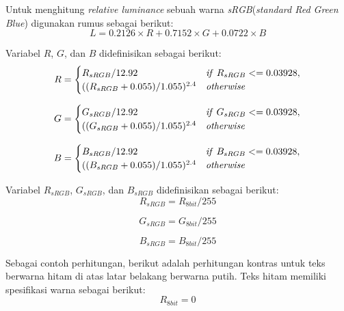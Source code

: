 Untuk menghitung \textit{relative luminance} sebuah warna \textit{sRGB}(\textit{standard Red Green Blue}) digunakan rumus sebagai berikut:
\begin{equation}
L = 0.2126 \times R + 0.7152 \times G + 0.0722 \times B
\end{equation}

Variabel $R$, $G$, dan $B$ didefinisikan sebagai berikut:
\begin{equation}
R = \begin{cases}
R_{sRGB}/12.92 & \text{\textit{if} $R_{sRGB} <= 0.03928$}, \\
((R_{sRGB} + 0.055)/1.055)^{2.4} & \text{\textit{otherwise}}
\end{cases}
\end{equation}

\begin{equation}
G = \begin{cases}
G_{sRGB}/12.92 & \text{\textit{if} $G_{sRGB} <= 0.03928$}, \\
((G_{sRGB} + 0.055)/1.055)^{2.4} & \text{\textit{otherwise}}
\end{cases}
\end{equation}

\begin{equation}
B = \begin{cases}
B_{sRGB}/12.92 & \text{\textit{if} $B_{sRGB} <= 0.03928$}, \\
((B_{sRGB} + 0.055)/1.055)^{2.4} & \text{\textit{otherwise}}
\end{cases}
\end{equation}

Variabel $R_{sRGB}$, $G_{sRGB}$, dan $B_{sRGB}$ didefinisikan sebagai berikut:
\begin{equation}
R_{sRGB} = R_{8bit} / 255
\end{equation}

\begin{equation}
G_{sRGB} = G_{8bit} / 255
\end{equation}

\begin{equation}
B_{sRGB} = B_{8bit} / 255
\end{equation}

Sebagai contoh perhitungan, berikut adalah perhitungan kontras untuk teks berwarna hitam di atas latar belakang berwarna putih. Teks hitam memiliki spesifikasi warna sebagai berikut:
\begin{equation}
R_{8bit} = 0
\end{equation}

